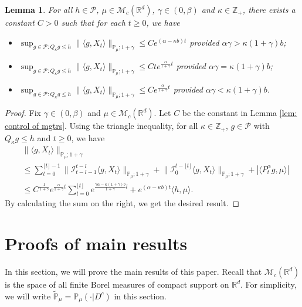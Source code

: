 \documentclass[12pt,a4paper]{amsart}
\theoremstyle{plain}
\newtheorem{lem}[thm]{Lemma}
\theoremstyle{definition}
\numberwithin{equation}{section}
\begin{document}
\begin{lem}
\label{lem: control moment}
    For all $h \in \mathcal P$, $\mu \in \mathcal M_c(\mathbb R^d)$, $\gamma\in (0, \beta)$ and $\kappa \in \mathbb Z_+$, there exists a constant $C > 0$ such that for each $t\geq 0$, we have
\begin{itemize}
\item[(1)]
    $\sup_{g\in \mathcal P: Q_\kappa g \leq h}\|\langle g,X_t\rangle\|_{\mathbb{P}_{\mu};1+\gamma}\leq C e^{(\alpha-\kappa b)t}$ provided $\alpha\gamma > \kappa (1+\gamma)b$;
\item[(2)]
    $\sup_{g\in \mathcal P: Q_\kappa g \leq h}\|\langle g,X_t\rangle\|_{\mathbb{P}_{\mu};1+\gamma}\leq C te^{\frac{\alpha}{1+\gamma}t}$ provided $\alpha\gamma = \kappa (1+\gamma)b$;
\item[(3)]
    $\sup_{g\in \mathcal P: Q_\kappa g \leq h} \|\langle g,X_t\rangle\|_{\mathbb{P}_{\mu};1+\gamma}\leq C e^{\frac{\alpha}{1+\gamma}t}$ provided $\alpha\gamma < \kappa (1+\gamma)b$.
\end{itemize}
\end{lem}
\begin{proof}
    Fix $\gamma \in (0,\beta)$ and $\mu \in \mathcal M_c(\mathbb R^d)$.
    Let $C$ be the constant in Lemma \ref{lem: control of mgtrs}.
    Using the triangle inequality, for all $\kappa\in \mathbb Z_+$, $g \in \mathcal P$ with $Q_\kappa g \leq h$ and $t\geq 0$, we have
\begin{align}
    &\|\langle g,X_t\rangle\|_{\mathbb P_\mu;1+\gamma}
        \\ &\leq \sum_{l=0}^{\lfloor t\rfloor - 1}\big\| \mathcal{I}_{t-l-1}^{t-l}\langle g,X_t\rangle \big\|_{\mathbb P_\mu;1+\gamma}+\big\| \mathcal{I}_{0}^{t-\lfloor t \rfloor}\langle g,X_t\rangle  \big\|_{\mathbb P_\mu;1+\gamma}
    + |\langle P^\alpha_t g,\mu\rangle|
    \\ &\leq C^{\frac{1}{1+\gamma}} e^{\frac{\alpha}{1+\gamma}t} \sum_{l=0}^{\lfloor t\rfloor} e^{\frac{\gamma\alpha-\kappa (1+\gamma)b}{1+\gamma} l} + e^{(\alpha - \kappa b)t} \langle h,\mu\rangle.
\end{align}
    By calculating the sum on the right, we get the desired result.
\end{proof}

\section{Proofs of main results}\label{proofs of main results}
    In this section, we will prove the main results of this paper. Recall that $\mathcal{M}_c(\mathbb{R}^d)$ is the space of all finite Borel measures of compact support on $\mathbb{R}^d$. 
    For simplicity, we will write $\mathbb{\tilde{P}}_{\mu}=\mathbb{P}_{\mu}(\cdot|D^c)$
    in this section.
\end{document}
